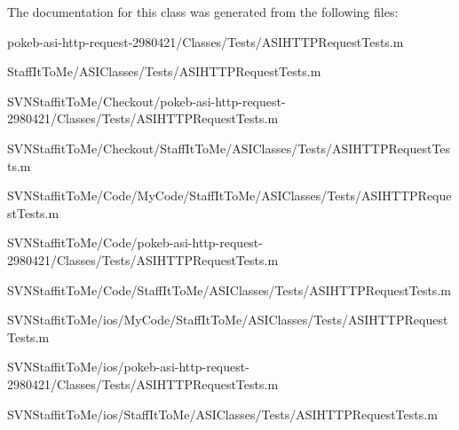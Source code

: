 \-The documentation for this class was generated from the following files\-:\begin{DoxyCompactItemize}
\item 
pokeb-\/asi-\/http-\/request-\/2980421/\-Classes/\-Tests/\-A\-S\-I\-H\-T\-T\-P\-Request\-Tests.\-m\item 
\-Staff\-It\-To\-Me/\-A\-S\-I\-Classes/\-Tests/\-A\-S\-I\-H\-T\-T\-P\-Request\-Tests.\-m\item 
\-S\-V\-N\-Staffit\-To\-Me/\-Checkout/pokeb-\/asi-\/http-\/request-\/2980421/\-Classes/\-Tests/\-A\-S\-I\-H\-T\-T\-P\-Request\-Tests.\-m\item 
\-S\-V\-N\-Staffit\-To\-Me/\-Checkout/\-Staff\-It\-To\-Me/\-A\-S\-I\-Classes/\-Tests/\-A\-S\-I\-H\-T\-T\-P\-Request\-Tests.\-m\item 
\-S\-V\-N\-Staffit\-To\-Me/\-Code/\-My\-Code/\-Staff\-It\-To\-Me/\-A\-S\-I\-Classes/\-Tests/\-A\-S\-I\-H\-T\-T\-P\-Request\-Tests.\-m\item 
\-S\-V\-N\-Staffit\-To\-Me/\-Code/pokeb-\/asi-\/http-\/request-\/2980421/\-Classes/\-Tests/\-A\-S\-I\-H\-T\-T\-P\-Request\-Tests.\-m\item 
\-S\-V\-N\-Staffit\-To\-Me/\-Code/\-Staff\-It\-To\-Me/\-A\-S\-I\-Classes/\-Tests/\-A\-S\-I\-H\-T\-T\-P\-Request\-Tests.\-m\item 
\-S\-V\-N\-Staffit\-To\-Me/ios/\-My\-Code/\-Staff\-It\-To\-Me/\-A\-S\-I\-Classes/\-Tests/\-A\-S\-I\-H\-T\-T\-P\-Request\-Tests.\-m\item 
\-S\-V\-N\-Staffit\-To\-Me/ios/pokeb-\/asi-\/http-\/request-\/2980421/\-Classes/\-Tests/\-A\-S\-I\-H\-T\-T\-P\-Request\-Tests.\-m\item 
\-S\-V\-N\-Staffit\-To\-Me/ios/\-Staff\-It\-To\-Me/\-A\-S\-I\-Classes/\-Tests/\-A\-S\-I\-H\-T\-T\-P\-Request\-Tests.\-m\end{DoxyCompactItemize}
